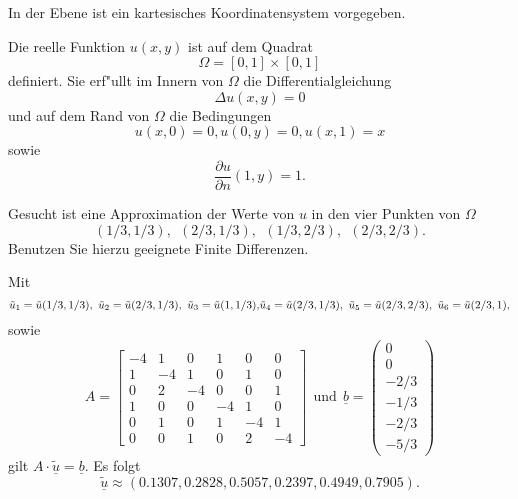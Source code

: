 In der Ebene ist ein kartesisches Koordinatensystem vorgegeben.

Die reelle Funktion $u(x,y)$ ist auf dem Quadrat
\[
\Omega = [0,1] \times [0,1]
\]
definiert. Sie erf"ullt im Innern von $\Omega$ die Differentialgleichung
\[
\Delta u(x,y) = 0
\]
und auf dem Rand von $\Omega$ die Bedingungen
\[
u(x,0) = 0, u(0,y) = 0, u(x,1) = x
\]
sowie
\[
\frac{\partial u}{\partial n}(1,y) = 1.
\]

Gesucht ist eine Approximation der Werte von $u$ in den vier Punkten von
$\Omega$
\[
(1/3,1/3), \ \  (2/3,1/3), \ \ (1/3,2/3), \ \ (2/3,2/3).
\]
Benutzen Sie hierzu geeignete Finite Differenzen.


\begin{loesung}
Mit
\[
\tilde u_1 = \tilde u(1/3,1/3), \ \tilde u_2 = \tilde u(2/3,1/3), \ \tilde u_3 = \tilde u(1,1/3),$$ $$\tilde u_4 = \tilde u(2/3,1/3), \ \tilde u_5 = \tilde u(2/3,2/3), \ \tilde u_6 = \tilde u(2/3,1),
\]
sowie
\[
A = \left[\begin{array}{rrrrrr} 
-4 & 1 & 0 & 1 & 0 & 0\\
1 & -4 & 1 & 0 & 1 & 0 \\
0 & 2 & -4 & 0 & 0 & 1 \\ 

1 & 0 & 0 & -4 & 1 & 0 \\
0 & 1 & 0 & 1 & -4 & 1 \\
0 & 0 & 1 & 0 & 2 & -4 \end{array}\right] \ \ \mbox{und} \ \
\underline{b} =  \left(\begin{array}{r} 0 \\ 0 \\ -2/3 \\ -1/3 \\ -2/3 \\ -5/3 \end{array}\right)
\]
gilt $A \cdot \underline{\tilde u} = \underline{b}.$ Es folgt
\[
\underline{\tilde u} \approx (0.1307, 0.2828, 0.5057, 0.2397, 0.4949, 0.7905).
\]
\end{loesung}

